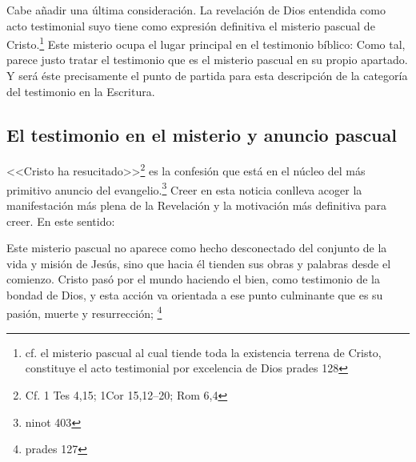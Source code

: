 Cabe añadir una última consideración. La revelación de Dios entendida como acto
testimonial suyo tiene como expresión definitiva el misterio pascual de
Cristo.\footnote{cf. el misterio pascual al cual tiende toda la existencia
  terrena de Cristo, constituye el acto testimonial por excelencia de Dios
  prades 128} Este misterio ocupa el lugar principal en el testimonio bíblico:
Como tal, parece justo tratar el testimonio que es el misterio pascual en su
propio apartado. Y será éste precisamente el punto de partida para esta
descripción de la categoría del testimonio en la Escritura.

\subsection{El testimonio en el misterio y anuncio pascual}

<<Cristo ha resucitado>>\footnote{Cf. 1 Tes 4,15; 1Cor 15,12--20; Rom 6,4} es la
confesión que está en el núcleo del más primitivo anuncio del
evangelio.\footnote{ninot 403} Creer en esta noticia conlleva acoger la
manifestación más plena de la Revelación y la motivación más definitiva para
creer. En este sentido:

Este misterio pascual no aparece como hecho desconectado del conjunto de la vida
y misión de Jesús, sino que hacia él tienden sus obras y palabras desde el
comienzo. Cristo pasó por el mundo haciendo el bien, como testimonio de la
bondad de Dios, y esta acción va orientada a ese punto culminante que es su
pasión, muerte y resurrección; \footnote{prades 127}

